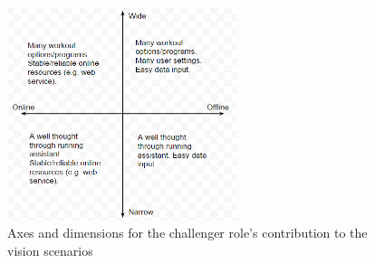\begin{figure}[h!]
  \centering
    \includegraphics[width=0.6\textwidth]{Images/axis2.PNG}
    \caption{Axes and dimensions for the challenger role's contribution to the vision scenarios}
    \label{fig:axis2}
\end{figure}
